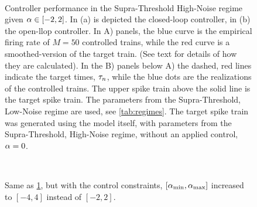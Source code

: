 \begin{figure}[htp]
\begin{center}
  \\
\caption[]{Controller performance in the Supra-Threshold High-Noise regime
given $\alpha \in [-2,2]$. 
  In (a) is depicted the closed-loop controller, in (b) the open-llop
  controller.
  In A) panels, the blue curve is the empirical firing
  rate of $M=50$ controlled trains, while the red curve is a
  smoothed-version of the target train. 
  (See text for details of how they are calculated). 
  In the B) panels below A) the dashed, red lines indicate the target times,
  ${\tau}_n$, while the blue dots are the realizations of the controlled trains.  
  The upper spike train above the solid line is the target spike train.
  The parameters from the Supra-Threshold, Low-Noise regime are used, see \cref{tab:regimes}. 
  The target spike train was generated
  using the model itself, with parameters from the Supra-Threshold, High-Noise regime, without an applied
  control, $\alpha=0$.
}
  \label{fig:targettrain_highnoise}     
\end{center}
\end{figure}

\begin{figure}[htp]
\begin{center}
\\
 \caption[ ]{Same as \cref{fig:targettrain_highnoise}, but with the control
  constraints, $[{ \alpha_{\textrm{min}} }, { \alpha_{\textrm{max}} }]$ increased to $[-4,4]$ instead of $[-2,2]$.}
  \label{fig:targettrain_cl_highnoise_aplus}     
\end{center}
\end{figure} 

